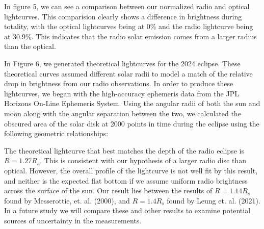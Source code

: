 In figure 5, we can see a comparison between our normalized radio and optical lightcurves.
This comparision clearly shows a difference in brightness during totality, with the optical lightcurves being at 0\% and the radio lightcurve being at 30.9\%.
This indicates that the radio solar emission comes from a larger radius than the optical.

In Figure 6, we generated theoretical lightcurves for the 2024 eclipse.
These theoretical curves assumed different solar radii to model a match of the relative drop in brightness from our radio observations.
In order to produce these lightcurves, we began with the high-accuracy ephemeris data from the JPL Horizons On-Line Ephemeris System.
Using the angular radii of both the sun and moon along with the angular separation between the two, we calculated the obscured area of the solar disk at 2000 points in time during the eclipse using the following geometric relationships:

The theoretical lightcurve that best matches the depth of the radio eclipse is $R = 1.27R_s$.
This is consistent with our hypothesis of a larger radio disc than optical.
However, the overall profile of the lightcurve is not well fit by this result, and neither is the expected flat bottom if we assume uniform radio brightness across the surface of the sun.
Our result lies between the results of $R=1.14R_s$ found by Messerottie, et. al. (2000), and $R=1.4R_s$ found by Leung et. al. (2021).
In a future study we will compare these and other results to examine potential sources of uncertainty in the measurements.
